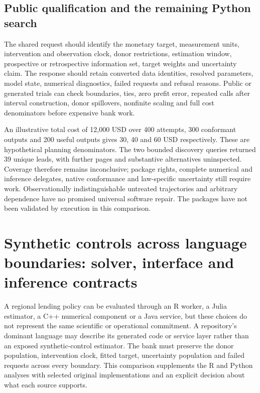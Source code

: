 \subsection{Public qualification and the remaining Python search}
The shared request should identify the monetary target, measurement units,
intervention and observation clock, donor restrictions, estimation window,
prospective or retrospective information set, target weights and uncertainty
claim. The response should retain converted data identities, resolved
parameters, model state, numerical diagnostics, failed requests and refusal
reasons. Public or generated trials can check boundaries, ties, zero
prefit error, repeated calls after interval construction, donor spillovers,
nonfinite scaling and full cost denominators before expensive bank work.
\citep{exec25_synthpy_choice}

An illustrative total cost of 12,000 USD over 400 attempts, 300 conformant
outputs and 200 useful outputs gives 30, 40 and 60 USD respectively.
These are hypothetical planning denominators. The two bounded discovery
queries returned 39 unique leads, with further pages and substantive
alternatives uninspected. Coverage therefore remains inconclusive; package
rights, complete numerical and inference delegates, native conformance and
law-specific uncertainty still require work. Observationally indistinguishable
untreated trajectories and arbitrary dependence have no promised universal
software repair. The packages have not been validated by execution in this comparison.
\citep{exec25_synthpy_choice}


\section{Synthetic controls across language boundaries: solver, interface and inference contracts}
\label{sec:exec25-synthetic-crosslanguage}

A regional lending policy can be evaluated through an R worker, a Julia
estimator, a C++ numerical component or a Java service, but these choices
do not represent the same scientific or operational commitment. A repository's
dominant language may describe its generated code or service layer rather
than an exposed synthetic-control estimator. The bank must preserve the
donor population, intervention clock, fitted target, uncertainty population
and failed requests across every boundary. This comparison supplements the
R and Python analyses with selected original implementations and an explicit
decision about what each source supports.~\citep{exec25_synthcross_choice}

